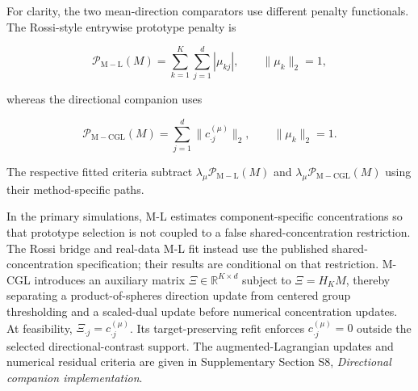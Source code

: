 \documentclass[preprint,12pt,authoryear]{elsarticle}
\begin{document}
\FloatBarrier
\begin{table}[H]
\centering
\small
\caption{Methods, support targets, and roles in the numerical comparisons.}
\label{tab:simulation-methods}
\end{table}

For clarity, the two mean-direction comparators use different penalty
functionals. The Rossi-style entrywise prototype penalty is

\[
\mathcal P_{\mathrm{M-L}}(M)
=\sum_{k=1}^K\sum_{j=1}^d|\mu_{kj}|,
\qquad
\lVert\mu_k\rVert_2=1,
\]

whereas the directional companion uses

\[
\mathcal P_{\mathrm{M-CGL}}(M)
=\sum_{j=1}^d
\lVert c_{\cdot j}^{(\mu)}\rVert_2,
\qquad
\lVert\mu_k\rVert_2=1.
\]

The respective fitted criteria subtract
$\lambda_\mu\mathcal P_{\mathrm{M-L}}(M)$ and
$\lambda_\mu\mathcal P_{\mathrm{M-CGL}}(M)$ using their method-specific
paths.

In the primary simulations, M-L estimates component-specific concentrations so
that prototype selection is not coupled to a false shared-concentration
restriction. The Rossi bridge and real-data M-L fit instead use the published
shared-concentration specification; their results are conditional on that
restriction. M-CGL introduces an auxiliary matrix
$\Xi\in\mathbb R^{K\times d}$ subject to $\Xi=H_KM$, thereby separating a
product-of-spheres direction update from centered group thresholding and a
scaled-dual update before numerical concentration updates. At feasibility,
$\Xi_{\cdot j}=c_{\cdot j}^{(\mu)}$. Its target-preserving refit enforces
$c_{\cdot j}^{(\mu)}=0$ outside the selected
directional-contrast support. The augmented-Lagrangian updates and numerical residual
criteria are given in Supplementary Section S8, \emph{Directional companion
implementation}.
\end{document}
